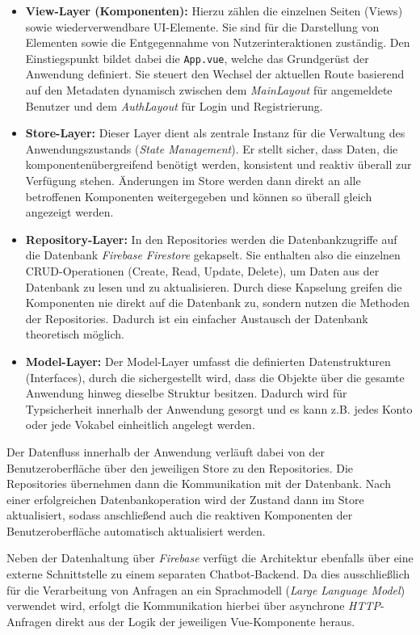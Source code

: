 \begin{itemize}
\item \textbf{View-Layer (Komponenten):} Hierzu zählen die einzelnen Seiten (Views) sowie wiederverwendbare UI-Elemente. Sie sind für die Darstellung von Elementen sowie die Entgegennahme von Nutzerinteraktionen zuständig. Den Einstiegspunkt bildet dabei die \texttt{App.vue}, welche das Grundgerüst der Anwendung definiert. Sie steuert den Wechsel der aktuellen Route basierend auf den Metadaten dynamisch zwischen dem \textit{MainLayout} für angemeldete Benutzer und dem \textit{AuthLayout} für Login und Registrierung.
\item \textbf{Store-Layer:} Dieser Layer dient als zentrale Instanz für die Verwaltung des Anwendungszustands (\textit{State Management}). Er stellt sicher, dass Daten, die komponentenübergreifend benötigt werden, konsistent und reaktiv überall zur Verfügung stehen. Änderungen im Store werden dann direkt an alle betroffenen Komponenten weitergegeben und können so überall gleich angezeigt werden. 
\item \textbf{Repository-Layer:} In den Repositories werden die Datenbankzugriffe auf die Datenbank \textit{Firebase Firestore} gekapselt. Sie enthalten also die einzelnen CRUD-Operationen (Create, Read, Update, Delete), um Daten aus der Datenbank zu lesen und zu aktualisieren. Durch diese Kapselung greifen die Komponenten nie direkt auf die Datenbank zu, sondern nutzen die Methoden der Repositories. Dadurch ist ein einfacher Austausch der Datenbank theoretisch möglich.
\item \textbf{Model-Layer:} Der Model-Layer umfasst die definierten Datenstrukturen (Interfaces), durch die sichergestellt wird, dass die Objekte über die gesamte Anwendung hinweg dieselbe Struktur besitzen. Dadurch wird für Typsicherheit innerhalb der Anwendung gesorgt und es kann z.B. jedes Konto oder jede Vokabel einheitlich angelegt werden.
\end{itemize}

Der Datenfluss innerhalb der Anwendung verläuft dabei von der Benutzeroberfläche über den jeweiligen Store zu den Repositories. Die Repositories übernehmen dann die Kommunikation mit der Datenbank.
Nach einer erfolgreichen Datenbankoperation wird der Zustand dann im Store aktualisiert, sodass anschließend auch die reaktiven Komponenten der Benutzeroberfläche automatisch aktualisiert werden.

Neben der Datenhaltung über \textit{Firebase} verfügt die Architektur ebenfalls über eine externe Schnittstelle zu einem separaten Chatbot-Backend. Da dies ausschließlich für die Verarbeitung von Anfragen an ein Sprachmodell 
(\textit{Large Language Model}) verwendet wird, erfolgt die Kommunikation hierbei über asynchrone \textit{HTTP}-Anfragen direkt aus der Logik der jeweiligen Vue-Komponente heraus.

